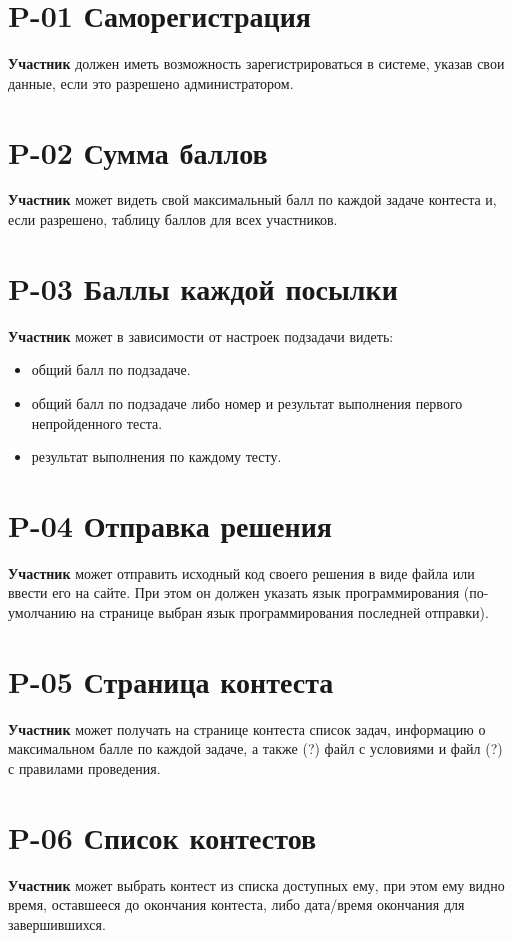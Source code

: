 \documentclass{book}
\begin{document}
\section*{P-01 Саморегистрация}
\textbf{Участник} должен иметь возможность зарегистрироваться в системе, указав свои
данные, если это разрешено администратором.

\newpage \section*{P-02 Сумма баллов}
\textbf{Участник} может видеть свой максимальный балл по каждой задаче контеста и,
если разрешено, таблицу баллов для всех участников.

\newpage \section*{P-03 Баллы каждой посылки}
\textbf{Участник} может в зависимости от настроек подзадачи видеть:
\begin{itemize}\setlength{\itemsep}{0pt}
\item общий балл по подзадаче.
\item общий балл по подзадаче либо номер и результат выполнения первого непройденного теста.
\item результат выполнения по каждому тесту.
\end{itemize}

\newpage \section*{P-04 Отправка решения}
\textbf{Участник} может отправить исходный код своего решения в виде файла или ввести
его на сайте. При этом он должен указать язык программирования (по-умолчанию
на странице выбран язык программирования последней отправки).

\newpage \section*{P-05 Страница контеста }
\textbf{Участник} может получать на странице контеста список задач, информацию о
максимальном балле по каждой задаче, а также (?) файл с условиями и файл (?) с
правилами проведения.

\newpage \section*{P-06 Список контестов }
\textbf{Участник} может выбрать контест из списка доступных ему, при этом ему видно
время, оставшееся до окончания контеста, либо дата/время окончания для
завершившихся.
\end{document}
